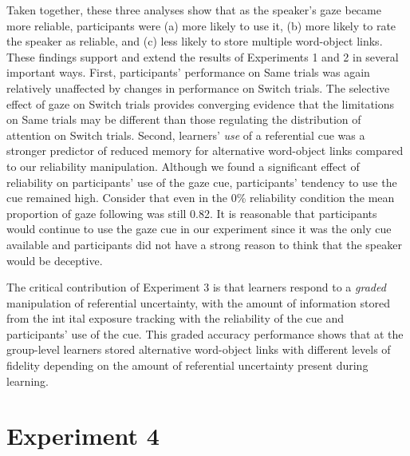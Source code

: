 \documentclass[authoryear, review]{elsarticle}
\begin{document}
Taken together, these three analyses show that as the speaker's gaze
became more reliable, participants were (a) more likely to use it, (b)
more likely to rate the speaker as reliable, and (c) less likely to
store multiple word-object links. These findings support and extend the
results of Experiments 1 and 2 in several important ways. First,
participants' performance on Same trials was again relatively unaffected
by changes in performance on Switch trials. The selective effect of gaze
on Switch trials provides converging evidence that the limitations on
Same trials may be different than those regulating the distribution of
attention on Switch trials. Second, learners' \emph{use} of a
referential cue was a stronger predictor of reduced memory for
alternative word-object links compared to our reliability manipulation.
Although we found a significant effect of reliability on participants'
use of the gaze cue, participants' tendency to use the cue remained
high. Consider that even in the 0\% reliability condition the mean
proportion of gaze following was still 0.82. It is reasonable that
participants would continue to use the gaze cue in our experiment since
it was the only cue available and participants did not have a strong
reason to think that the speaker would be deceptive.

The critical contribution of Experiment 3 is that learners respond to a
\emph{graded} manipulation of referential uncertainty, with the amount
of information stored from the int ital exposure tracking with the
reliability of the cue and participants' use of the cue. This graded
accuracy performance shows that at the group-level learners stored
alternative word-object links with different levels of fidelity
depending on the amount of referential uncertainty present during
learning.

\section{Experiment 4}\label{experiment-4}
\end{document}
